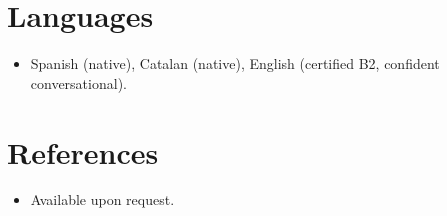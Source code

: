 \documentclass[11pt,a4paper,sans]{moderncv}
\begin{document}
\section{Languages}
\vspace{1pt}
\begin{itemize}
\item Spanish (native), Catalan (native), English (certified B2, confident conversational).
\end{itemize}


\section{References}
\vspace{1pt}
\begin{itemize}
\item{Available upon request.}
\end{itemize}
\end{document}
